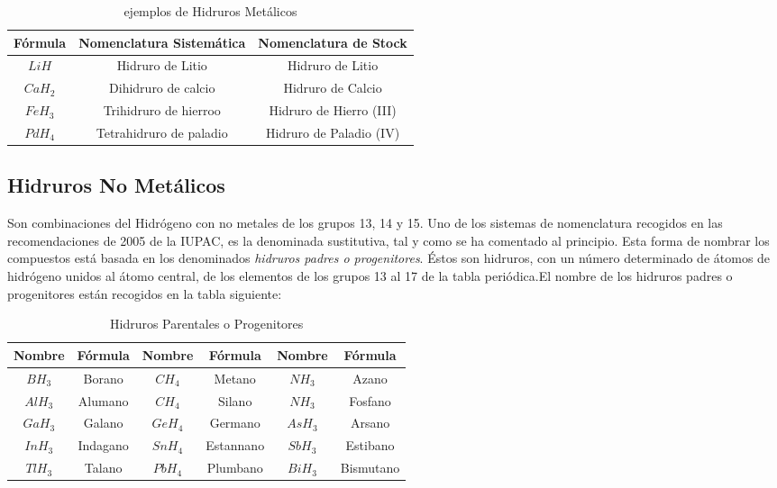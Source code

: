 \begin{table}[h!]
	\centering
	\begin{tabular}{c|cc}
	Fórmula&Nomenclatura Sistemática&Nomenclatura de Stock\\ \hline
	$LiH$&Hidruro de Litio&Hidruro de Litio\\ 
	$CaH_2$&Dihidruro de calcio&Hidruro de Calcio\\
	$FeH_3$&Trihidruro de hierroo&Hidruro de Hierro (III)\\
	$PdH_4$&Tetrahidruro de paladio&Hidruro de Paladio (IV)\\ \hline
	\end{tabular}
	\caption{ejemplos de Hidruros Metálicos}
\end{table}
\subsection{Hidruros No Metálicos}
Son combinaciones del Hidrógeno con no metales de los grupos 13, 14 y 15. Uno de los sistemas de nomenclatura recogidos en las recomendaciones de 2005 de la IUPAC, es la denominada sustitutiva, tal y como se ha comentado al principio. Esta forma de nombrar los compuestos está basada en los denominados \emph{hidruros padres o progenitores}. Éstos son hidruros, con un número determinado de átomos de hidrógeno unidos al átomo central, de los elementos de los grupos 13 al 17 de la tabla periódica.El nombre de los hidruros padres o progenitores están recogidos en la tabla siguiente:
\begin{table}[h!]
	\centering
	\begin{tabular}{c|c||c|c||c|c}\hline
		Nombre&Fórmula&Nombre&Fórmula&Nombre&Fórmula\\ \hline
		$BH_3$&Borano&$CH_4$&Metano&$NH_3$&Azano\\
		$AlH_3$&Alumano&$CH_4$&Silano&$NH_3$&Fosfano\\
		$GaH_3$&Galano&$GeH_4$&Germano&$AsH_3$&Arsano\\
		$InH_3$&Indagano&$SnH_4$&Estannano&$SbH_3$&Estibano\\
		$TlH_3$&Talano&$PbH_4$&Plumbano&$BiH_3$&Bismutano\\ \hline
	\end{tabular}
	\caption{Hidruros Parentales o Progenitores}
\end{table}


